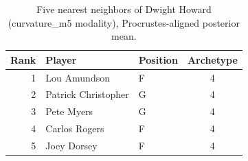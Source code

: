 \begin{table}[htbp]
  \centering\small
  \begin{tabular}{rllc}
    \toprule
    Rank & Player & Position & Archetype \\
    \midrule
    1 & Lou Amundson & F & 4 \\
    2 & Patrick Christopher & G & 4 \\
    3 & Pete Myers & G & 4 \\
    4 & Carlos Rogers & F & 4 \\
    5 & Joey Dorsey & F & 4 \\
    \bottomrule
  \end{tabular}
  \caption{Five nearest neighbors of Dwight Howard (curvature_m5 modality), Procrustes-aligned posterior mean.}
  \label{tab:Dwight_Howard_neighbors_curvature_m5}
\end{table}

